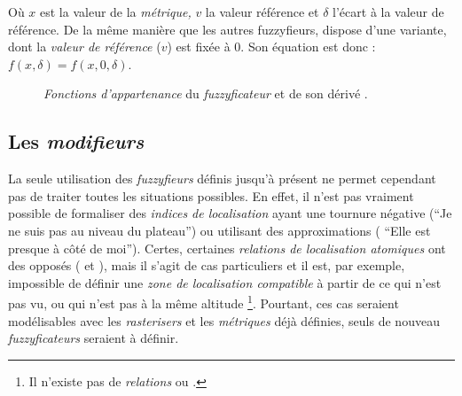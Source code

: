 Où \(x\) est la valeur de la \emph{métrique,} \(v\) la valeur
référence et \(\delta\) l'écart à la valeur de référence. De la même
manière que les autres \textrm{fuzzyfieurs,}  dispose
d'une variante,  dont la \emph{valeur de référence}
(\(v\)) est fixée à 0. Son équation est donc :
\(f(x,\delta) = f(x,0,\delta)\).

\begin{figure}
  \centering
  \hfill
  \caption{\emph{Fonctions d'appartenance} du \emph{fuzzyficateur}
    \protect{} et de son dérivé
    \protect{}.}
  \label{fig:select_infval}
\end{figure}

\subsection{Les \emph{modifieurs}}

La seule utilisation des \emph{fuzzyfieurs} définis jusqu'à présent ne
permet cependant pas de traiter toutes les situations possibles. En
effet, il n'est pas vraiment possible de formaliser des \emph{indices
  de localisation} ayant une tournure négative (\eg \enquote{Je ne
  suis pas au niveau du plateau}) ou utilisant des approximations (\eg
\enquote{Elle est presque à côté de moi}). Certes, certaines
\emph{relations de localisation atomiques} ont des opposés (\eg
{} et ), mais il s'agit de
cas particuliers et il est, par exemple, impossible de définir une
\emph{zone de localisation compatible} à partir de ce qui n'est pas
vu, ou qui n'est pas à la même altitude \footnote{Il n'existe pas de
  \emph{relations}  ou
  .}. Pourtant, ces cas
seraient modélisables avec les \emph{rasterisers} et les
\emph{métriques} déjà définies, seuls de nouveau \emph{fuzzyficateurs}
seraient à définir.

